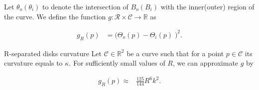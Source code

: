 Let $\theta_o (\theta_i)$ to denote the intersection of $B_o(B_i)$ with the inner(outer) region of the curve. We define the function $g:\mathcal{R} \times \mathcal{C}\rightarrow \mathbb{R}$ as

\begin{align*}
	g_{R}(p) &= \Big( \Theta_o(p) - \Theta_i(p) \;\Big)^2.
\end{align*}

\begin{claim}{R-separated disks curvature}\label{claim:r-separated-disks}
 Let $\mathcal{C} \in \mathbb{R}^2$ be a curve such that for a point $p \in \mathcal{C}$ its curvature equals to $\kappa$. For sufficiently small values of $R$, we can approximate $g$ by


\begin{align*}
g_R(p) \approx & \frac{125}{144}R^6k^2.
\end{align*} 
\end{claim}



